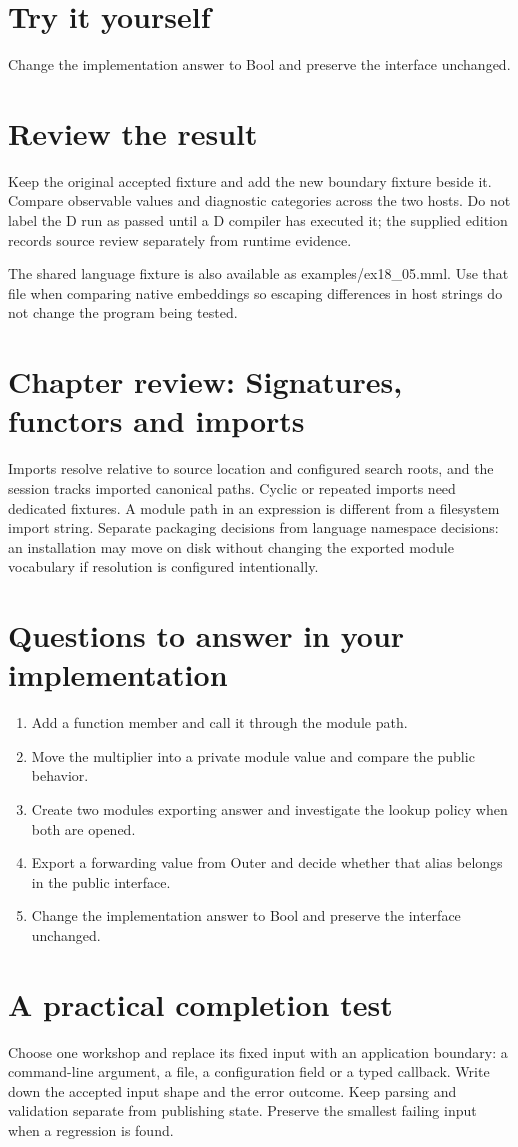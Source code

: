 \section*{Try it yourself}
Change the implementation answer to Bool and preserve the interface unchanged.

\section*{Review the result}
Keep the original accepted fixture and add the new boundary fixture beside it. Compare observable values and diagnostic categories across the two hosts. Do not label the D run as passed until a D compiler has executed it; the supplied edition records source review separately from runtime evidence.

The shared language fixture is also available as examples/ex18\_05.mml. Use that file when comparing native embeddings so escaping differences in host strings do not change the program being tested.

\clearpage
\section*{Chapter review: Signatures, functors and imports}
Imports resolve relative to source location and configured search roots, and the session tracks imported canonical paths. Cyclic or repeated imports need dedicated fixtures. A module path in an expression is different from a filesystem import string. Separate packaging decisions from language namespace decisions: an installation may move on disk without changing the exported module vocabulary if resolution is configured intentionally.

\section*{Questions to answer in your implementation}
\begin{enumerate}
\item Add a function member and call it through the module path.
\item Move the multiplier into a private module value and compare the public behavior.
\item Create two modules exporting answer and investigate the lookup policy when both are opened.
\item Export a forwarding value from Outer and decide whether that alias belongs in the public interface.
\item Change the implementation answer to Bool and preserve the interface unchanged.
\end{enumerate}
\section*{A practical completion test}
Choose one workshop and replace its fixed input with an application boundary: a command-line argument, a file, a configuration field or a typed callback. Write down the accepted input shape and the error outcome. Keep parsing and validation separate from publishing state. Preserve the smallest failing input when a regression is found.

